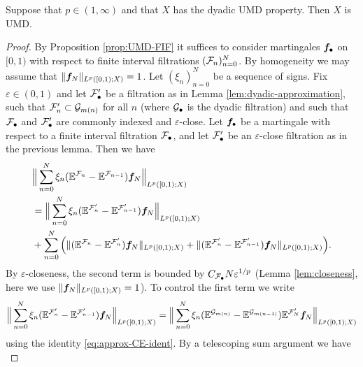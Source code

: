 \begin{thm}\label{thm:dyadic-UMD}
  Suppose that $p \in (1,\infty)$ and that $X$ has the dyadic UMD property.
  Then $X$ is UMD.
\end{thm}

\begin{proof}
  By Proposition \ref{prop:UMD-FIF} it suffices to consider martingales $\bm{f}_{\bullet}$ on $[0,1)$ with respect to finite interval filtrations $(\mathcal{F}_{n})_{n=0}^{N}$.
  By homogeneity we may assume that $\|\bm{f}_{N}\|_{L^p([0,1);X)} = 1$.
  Let $(\xi_{n})_{n=0}^{N}$ be a sequence of signs.
  Fix $\varepsilon \in (0,1)$ and let $\mathcal{F}'_{\bullet}$ be a filtration as in Lemma \ref{lem:dyadic-approximation}, such that $\mathcal{F}_{n}' \subset \mathcal{G}_{m(n)}$ for all $n$ (where $\mathcal{G}_{\bullet}$ is the dyadic filtration) and such that $\mathcal{F}_{\bullet}$ and $\mathcal{F}_{\bullet}'$ are commonly indexed and $\varepsilon$-close.
  Let $\bm{f}_{\bullet}$ be a martingale with respect to a finite interval filtration $\mathcal{F}_{\bullet}$, and let $\mathcal{F}'_{\bullet}$ be an $\varepsilon$-close filtration as in the previous lemma.
  Then we have
  \begin{equation*}
    \begin{aligned}
      &\Big\| \sum_{n=0}^{N} \xi_{n} (\mathbb{E}^{\mathcal{F}_{n}} - \mathbb{E}^{\mathcal{F}_{n-1}}) \bm{f}_{N} \Big\|_{L^p([0,1);X)} \\
      &= \Big\| \sum_{n=0}^{N} \xi_{n} (\mathbb{E}^{\mathcal{F}'_{n}} - \mathbb{E}^{\mathcal{F}'_{n-1}}) \bm{f}_{N} \Big\|_{L^p([0,1);X)} \\
      &+ \sum_{n=0}^{N} \Big( \| (\mathbb{E}^{\mathcal{F}_{n}} - \mathbb{E}^{\mathcal{F}'_{n}}) \bm{f}_{N}\|_{L^p([0,1);X)}
      +  \| (\mathbb{E}^{\mathcal{F}'_{n}} - \mathbb{E}^{\mathcal{F}'_{n-1}}) \bm{f}_{N} \|_{L^p([0,1);X)} \Big).
    \end{aligned}
  \end{equation*}
  By $\varepsilon$-closeness, the second term is bounded by $C_{\mathcal{F}_{\bullet}} N \varepsilon^{1/p}$ (Lemma \ref{lem:closeness}, here we use $\|\bm{f}_{N}\|_{L^p([0,1);X)} = 1$).
  To control the first term we write
  \begin{equation*}
    \Big\| \sum_{n=0}^{N} \xi_{n} (\mathbb{E}^{\mathcal{F}'_{n}} - \mathbb{E}^{\mathcal{F}'_{n-1}}) \bm{f}_{N} \Big\|_{L^p([0,1);X)}
    = \Big\| \sum_{n=0}^{N} \xi_{n} (\mathbb{E}^{\mathcal{G}_{m(n)}} - \mathbb{E}^{\mathcal{G}_{m(n-1)}}) \mathbb{E}^{\mathcal{F}'_{N}} \bm{f}_{N} \Big\|_{L^p([0,1);X)}
  \end{equation*}
  using the identity \eqref{eq:approx-CE-ident}.
  By a telescoping sum argument we have
  \begin{equation*}

\end{equation*}
\end{proof}
